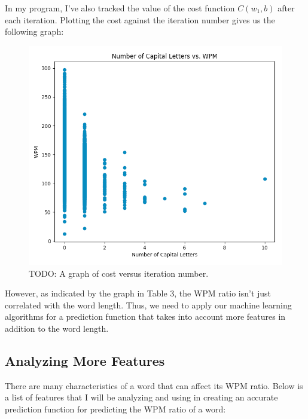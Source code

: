 \documentclass[12pt]{article}
\begin{document}
In my program, I've also tracked the value of the cost function $C(w_1, b)$ after each iteration. Plotting the cost against the iteration number gives us the following graph:
\begin{figure}[H]
	\centering
	\caption{TODO: A graph of cost versus iteration number.}
	\includegraphics{todo.png}
\end{figure}

However, as indicated by the graph in Table 3, the WPM ratio isn't just correlated with the word length. Thus, we need to apply our machine learning algorithms for a prediction function that takes into account more features in addition to the word length.

\subsection*{Analyzing More Features}
There are many characteristics of a word that can affect its WPM ratio. Below is a list of features that I will be analyzing and using in creating an accurate prediction function for predicting the WPM ratio of a word:
\end{document}
